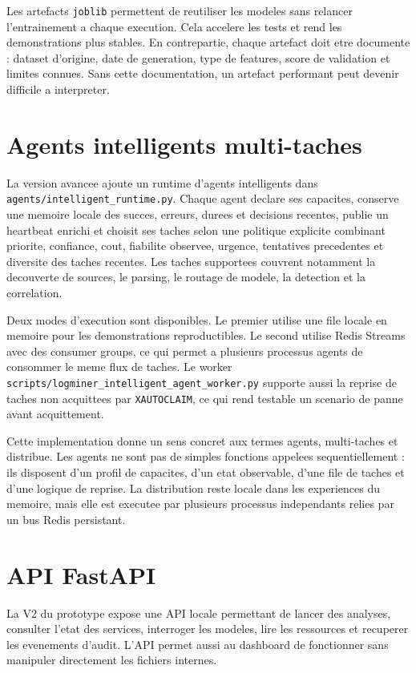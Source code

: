Les artefacts \texttt{joblib} permettent de reutiliser les modeles sans relancer l'entrainement a chaque execution. Cela accelere les tests et rend les demonstrations plus stables. En contrepartie, chaque artefact doit etre documente : dataset d'origine, date de generation, type de features, score de validation et limites connues. Sans cette documentation, un artefact performant peut devenir difficile a interpreter.

\section{Agents intelligents multi-taches}
La version avancee ajoute un runtime d'agents intelligents dans \texttt{agents/intelligent\_runtime.py}. Chaque agent declare ses capacites, conserve une memoire locale des succes, erreurs, durees et decisions recentes, publie un heartbeat enrichi et choisit ses taches selon une politique explicite combinant priorite, confiance, cout, fiabilite observee, urgence, tentatives precedentes et diversite des taches recentes. Les taches supportees couvrent notamment la decouverte de sources, le parsing, le routage de modele, la detection et la correlation.

Deux modes d'execution sont disponibles. Le premier utilise une file locale en memoire pour les demonstrations reproductibles. Le second utilise Redis Streams avec des consumer groups, ce qui permet a plusieurs processus agents de consommer le meme flux de taches. Le worker \texttt{scripts/logminer\_intelligent\_agent\_worker.py} supporte aussi la reprise de taches non acquittees par \texttt{XAUTOCLAIM}, ce qui rend testable un scenario de panne avant acquittement.

Cette implementation donne un sens concret aux termes agents, multi-taches et distribue. Les agents ne sont pas de simples fonctions appelees sequentiellement : ils disposent d'un profil de capacites, d'un etat observable, d'une file de taches et d'une logique de reprise. La distribution reste locale dans les experiences du memoire, mais elle est executee par plusieurs processus independants relies par un bus Redis persistant.

\section{API FastAPI}
La V2 du prototype expose une API locale permettant de lancer des analyses, consulter l'etat des services, interroger les modeles, lire les ressources et recuperer les evenements d'audit. L'API permet aussi au dashboard de fonctionner sans manipuler directement les fichiers internes.

